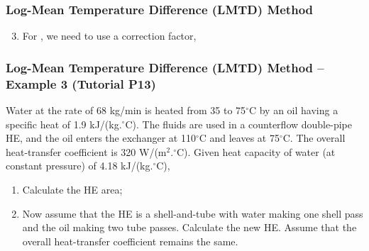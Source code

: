 \documentclass[10pt,compress,unknownkeysallowed]{beamer}
\begin{document}
\begin{frame}
  \frametitle{Log-Mean Temperature Difference (LMTD) Method}
     \begin{enumerate}\setcounter{enumi}{2}
          \item<1-> For , we need to use a correction factor, 
     \end{enumerate}

\end{frame}

\begin{frame}
  \frametitle{Log-Mean Temperature Difference (LMTD) Method -- Example 3 (Tutorial P13)}
Water at the rate of 68 kg/min is heated from 35 to 75$^{\circ}$C by an oil having a specific heat of 1.9 kJ/(kg.$^{\circ}$C). The fluids are used in a counterflow double-pipe HE, and the oil enters the exchanger at 110$^{\circ}$C and leaves at 75$^{\circ}$C. The overall heat-transfer coefficient is 320 W/(m$^{2}.^{\circ}$C). Given heat capacity of water (at constant pressure) of 4.18 kJ/(kg.$^{\circ}$C),
\begin{enumerate}
   \item Calculate the HE area;
   \item Now assume that the HE is a shell-and-tube with water making one shell pass and the oil making two tube passes. Calculate the new HE. Assume that the overall heat-transfer coefficient remains the same. 
\end{enumerate}
\end{frame}
\end{document}
